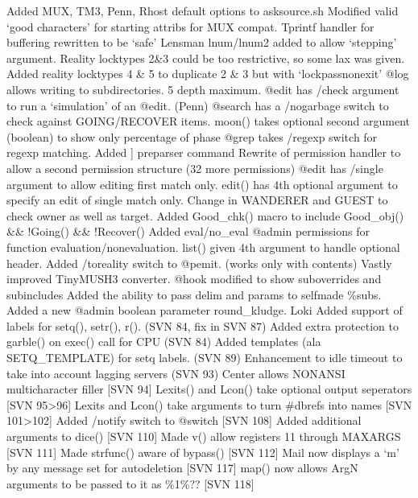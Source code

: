 \documentclass[letterpaper,10pt,english]{sphinxmanual}
\begin{document}
\sphinxAtStartPar
Added MUX, TM3, Penn, Rhost default options to asksource.sh
Modified valid ‘good characters’ for starting attribs for MUX compat.
Tprintf handler for buffering rewritten to be ‘safe’ \sphinxhyphen{} Lensman
lnum/lnum2 added to allow ‘stepping’ argument.
Reality locktypes 2\&3 could be too restrictive, so some lax was given.
Added reality locktypes 4 \& 5 to duplicate 2 \& 3 but with ‘lock\sphinxhyphen{}pass\sphinxhyphen{}nonexit’
@log allows writing to subdirectories.  5 depth maximum.
@edit has /check argument to run a ‘simulation’ of an @edit. (Penn)
@search has a /nogarbage switch to check against GOING/RECOVER items.
moon() takes optional second argument (boolean) to show only percentage of phase
@grep takes /regexp switch for regexp matching.
Added {]} pre\sphinxhyphen{}parser command
Rewrite of permission handler to allow a second permission structure (32 more permissions)
@edit has /single argument to allow editing first match only.
edit() has 4th optional argument to specify an edit of single match only.
Change in WANDERER and GUEST to check owner as well as target.
Added Good\_chk() macro to include Good\_obj() \&\& !Going() \&\& !Recover()
Added eval/no\_eval @admin permissions for function evaluation/non\sphinxhyphen{}evaluation.
list() given 4th argument to handle optional header.
Added /toreality switch to @pemit. (works only with contents)
Vastly improved TinyMUSH3 converter.
@hook modified to show sub\sphinxhyphen{}overrides and sub\sphinxhyphen{}includes
Added the ability to pass delim and params to self\sphinxhyphen{}made \%\sphinxhyphen{}subs.
Added a new @admin boolean parameter round\_kludge. \sphinxhyphen{} Loki
Added support of labels for setq(), setr(), r(). (SVN 84, fix in SVN 87)
Added extra protection to garble() on exec() call for CPU (SVN 84)
Added templates (ala SETQ\_TEMPLATE) for setq labels. (SVN 89)
Enhancement to idle timeout to take into account lagging servers (SVN 93)
Center allows NON\sphinxhyphen{}ANSI multi\sphinxhyphen{}character filler {[}SVN 94{]}
Lexits() and Lcon() take optional output seperators {[}SVN 95\sphinxhyphen{}\textgreater{}96{]}
Lexits and Lcon() take arguments to turn \#dbrefs into names {[}SVN 101\sphinxhyphen{}\textgreater{}102{]}
Added /notify switch to @switch {[}SVN 108{]}
Added additional arguments to dice() {[}SVN 110{]}
Made v() allow registers 11 through MAX\sphinxhyphen{}ARGS {[}SVN 111{]}
Made strfunc() aware of bypass() {[}SVN 112{]}
Mail now displays a ‘m’ by any message set for auto\sphinxhyphen{}deletion {[}SVN 117{]}
map() now allows ArgN arguments to be passed to it as \%1\sphinxhyphen{}\%?? {[}SVN 118{]}
\end{document}
